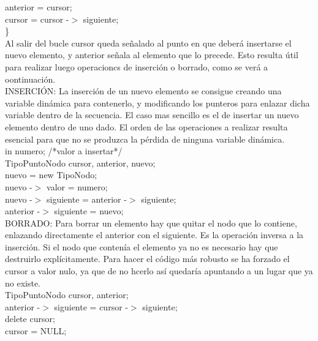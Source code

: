 \documentclass[11pt,a4paper]{article}
\begin{document}
  anterior = cursor;\\
  cursor = cursor -$>$ siguiente;\\
  \} \\
  Al salir del bucle cursor queda señalado al punto en que deberá insertarse el nuevo elemento, y anterior señala al elemento que lo precede. Esto resulta
  útil para realizar luego operacioncs de inserción o borrado, como se verá a
  oontinuación.\\
  INSERCIÓN: La inserción de un nuevo elemento se consigue creando una variable dinámica para contenerlo, y modificando los punteros para enlazar dicha variable dentro de la secuencia. El caso mas sencillo es el de insertar un nuevo elemento dentro de uno dado. El orden de las operaciones a realizar resulta esencial para que no se produzca la pérdida de ninguna variable dinámica.\\
  in numero;  /*valor a insertar*/\\
  TipoPuntoNodo cursor, anterior, nuevo;\\
  nuevo = new TipoNodo;\\
  nuevo -$>$ valor = numero;\\
  nuevo -$>$ siguiente = anterior -$>$ siguiente;\\
  anterior -$>$ siguiente = nuevo;\\
  BORRADO: Para borrar un elemento hay que quitar el nodo que lo contiene, enlazando directamente el anterior con el siguiente. Es la operación inversa a la inserción. Si el nodo que contenía el elemento ya no es necesario hay que destruirlo explícitamente. Para hacer el código más robusto se ha forzado el cursor a valor nulo, ya que de no hcerlo así quedaría apuntando a un lugar que ya no existe.\\
  TipoPuntoNodo cursor, anterior;\\
  anterior -$>$ siguiente = cursor -$>$ siguiente;\\
  delete cursor;\\
  cursor = NULL;
\end{document}
